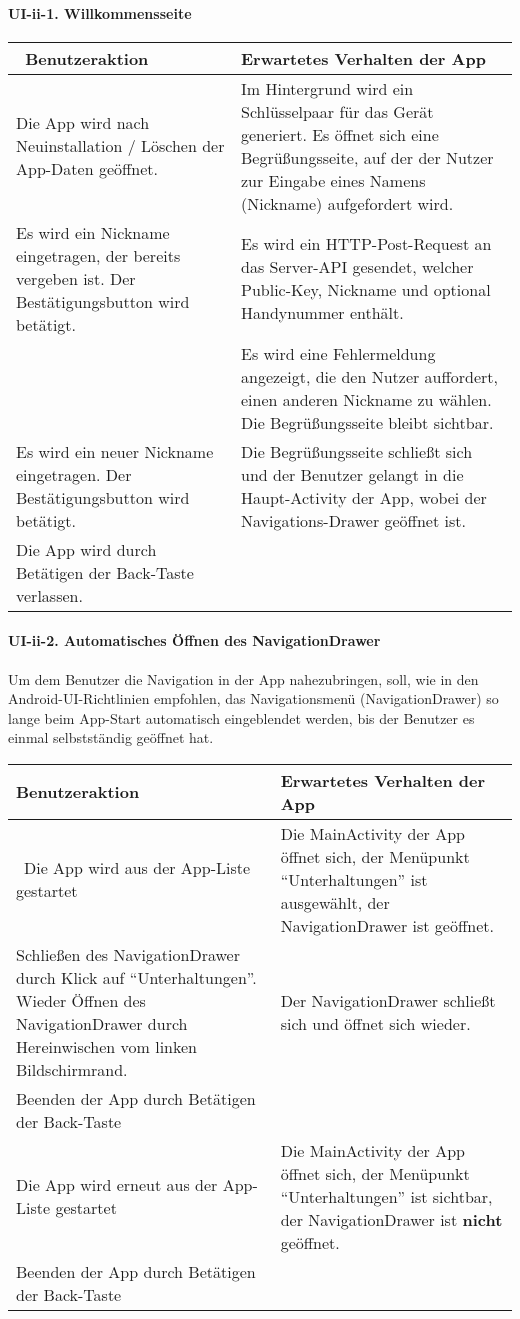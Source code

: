 \paragraph{UI-ii-1. Willkommensseite}\label{willkommensseite}

\begin{longtable}{|p{8cm}|p{8.5cm}|}
\hline
~Benutzeraktion & Erwartetes Verhalten der App\tabularnewline
\hline

Die App wird nach Neuinstallation / Löschen der App-Daten geöffnet. & Im
Hintergrund wird ein Schlüsselpaar für das Gerät generiert. Es öffnet
sich eine Begrüßungsseite, auf der der Nutzer zur Eingabe eines Namens
(Nickname) aufgefordert wird.\tabularnewline
Es wird ein Nickname eingetragen, der bereits vergeben ist. Der
Bestätigungsbutton wird betätigt. & Es wird ein HTTP-Post-Request an das
Server-API gesendet, welcher Public-Key, Nickname und optional
Handynummer enthält.\tabularnewline
~ & Es wird eine Fehlermeldung angezeigt, die den Nutzer auffordert,
einen anderen Nickname zu wählen. Die Begrüßungsseite bleibt
sichtbar.\tabularnewline
Es wird ein neuer Nickname eingetragen. Der Bestätigungsbutton wird
betätigt. & Die Begrüßungsseite schließt sich und der Benutzer gelangt
in die Haupt-Activity der App, wobei der Navigations-Drawer geöffnet
ist.\tabularnewline
Die App wird durch Betätigen der Back-Taste verlassen. &\tabularnewline
\hline
\end{longtable}

\paragraph{UI-ii-2. Automatisches Öffnen des
NavigationDrawer}\label{automatisches-uxf6ffnen-des-navigationdrawer}

Um dem Benutzer die Navigation in der App nahezubringen, soll, wie in
den Android-UI-Richtlinien empfohlen, das Navigationsmenü
(NavigationDrawer) so lange beim App-Start automatisch eingeblendet
werden, bis der Benutzer es einmal selbstständig geöffnet hat.

\begin{longtable}{|p{8cm}|p{8.5cm}|}
\hline
Benutzeraktion & Erwartetes Verhalten der App\tabularnewline
\hline

~Die App wird aus der App-Liste gestartet & Die MainActivity der App
öffnet sich, der Menüpunkt ``Unterhaltungen'' ist ausgewählt, der
NavigationDrawer ist geöffnet.\tabularnewline
Schließen des NavigationDrawer durch Klick auf ``Unterhaltungen''.
Wieder Öffnen des NavigationDrawer durch Hereinwischen vom linken
Bildschirmrand. & Der NavigationDrawer schließt sich und öffnet sich
wieder.\tabularnewline
Beenden der App durch Betätigen der Back-Taste &\tabularnewline
Die App wird erneut aus der App-Liste gestartet & Die MainActivity der
App öffnet sich, der Menüpunkt ``Unterhaltungen'' ist sichtbar, der
NavigationDrawer ist \textbf{nicht} geöffnet.\tabularnewline
Beenden der App durch Betätigen der Back-Taste &\tabularnewline
\hline
\end{longtable}

